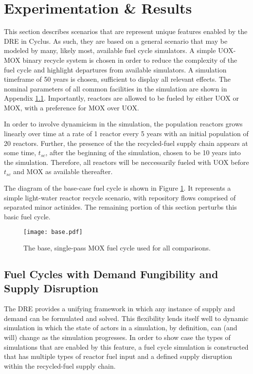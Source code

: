 \section{Experimentation \& Results}\label{results}

This section describes scenarios that are represent unique features enabled by
the DRE in Cyclus. As such, they are based on a general scenario that may be
modeled by many, likely most, available fuel cycle simulators. A simple UOX-MOX
binary recycle system is chosen in order to reduce the complexity of the fuel
cycle and highlight departures from available simulators. A simulation timeframe
of 50 years is chosen, sufficient to display all relevant effects. The nominal
parameters of all common facilities in the simulation are shown in Appendix
\ref{}. Importantly, reactors are allowed to be fueled by either UOX or MOX,
with a preference for MOX over UOX.

In order to involve dynamicism in the simulation, the population reactors grows
linearly over time at a rate of 1 reactor every 5 years with an initial
population of 20 reactors. Further, the presence of the the recycled-fuel supply
chain appears at some time, $t_{sc}$, after the beginning of the simulation,
chosen to be 10 years into the simulation. Therefore, all reactors will be
neccessarily fueled with UOX before $t_{sc}$ and MOX as available thereafter. 

The diagram of the base-case fuel cycle is shown in Figure \ref{fig:base}. It
represents a simple light-water reactor recycle scenario, with repository flows
comprised of separated minor actinides. The remaining portion of this section
perturbs this basic fuel cycle.

\begin{figure}
  \begin{center}
    \texttt{[image: base.pdf]}
    \caption[]{
      \label{fig:base}
      The base, single-pass MOX fuel cycle used for all comparisons.}
  \end{center}
\end{figure}

\subsection{Fuel Cycles with Demand Fungibility and Supply Disruption}

The DRE provides a unifying framework in which any instance of supply and demand
can be formulated and solved. This flexibility lends itself well to dynamic
simulation in which the state of actors in a simulation, by definition, can (and
will) change as the simulation progresses. In order to show case the types of
simulations that are enabled by this feature, a fuel cycle simulation is
constructed that has multiple types of reactor fuel input and a defined supply
disruption within the recycled-fuel supply chain.

